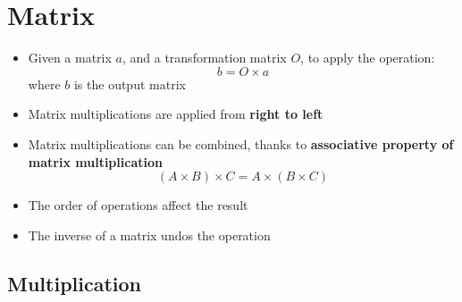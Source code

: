 \chapter{Matrix}

\begin{itemize}
  \item Given a matrix $ a $, and a transformation matrix $ O $, to apply
  the operation:
  \begin{equation}
    b = O \times a
  \end{equation}
  where $ b $ is the output matrix

  \item Matrix multiplications are applied from \textbf{right to left}
  \item Matrix multiplications can be combined, thanks to \textbf{associative
  property of matrix multiplication}
  \begin{equation}
    \left( A \times B \right) \times C = A \times \left( B \times C \right)
  \end{equation}

  \item The order of operations affect the result
  \item The inverse of a matrix undos the operation
\end{itemize}

\section{Multiplication}
